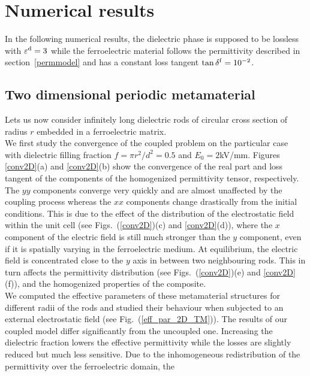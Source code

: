 \documentclass[%
 reprint,
 amsmath,amssymb,
 aps,
]{revtex4-2}
\newcommand{\epsd}{\varepsilon^{\rm d}}
\newcommand{\fig}[1]{Fig.~(\ref{#1})}
\begin{document}
\section*{Numerical results}
In the following numerical results, the dielectric phase is supposed to be
lossless with $\epsd = 3$ while the ferroelectric material follows the
permittivity described in section~\ref{permmodel} and has a constant loss
tangent $\tan \delta^{\rm f} = 10^{-2}$.



\subsection*{Two dimensional periodic metamaterial}
Lets us now consider infinitely long dielectric rods of circular cross section
of radius $r$ embedded in a ferroelectric matrix.\\
We first study the convergence of the coupled problem on the particular case with dielectric
filling fraction $f=\pi r^2/d^2=0.5$ and $E_0=2$kV/mm. Figures \ref{conv2D}(a) and \ref{conv2D}(b) show the
convergence of the real part and loss tangent of the components of the homogenized
 permittivity tensor, respectively. The $yy$ components converge very quickly
 and are almost unaffected by the coupling process whereas the
 $xx$ components change drastically from the initial conditions.
 This is due to the effect of the distribution
 of the electrostatic field within the unit cell (see Figs.~(\ref{conv2D})(c) and \ref{conv2D}(d)),
 where the $x$ component of the electric field is still much stronger
 than the $y$ component, even if it is spatially varying in the ferroelectric medium.
 At equilibrium, the electric field is concentrated close to the $y$ axis in between two neighbouring
 rods. This in turn affects the permittivity distribution (see Figs.~(\ref{conv2D})(e) and \ref{conv2D}(f)),
 and the homogenized properties of the composite.\\
 We computed the effective parameters of these metamaterial structures for different
 radii of the rods and studied their behaviour when subjected to an external
 electrostatic field (see \fig{eff_par_2D_TM}). The results of our coupled
 model differ significantly from the uncoupled one. Increasing the dielectric fraction
 lowers the effective permittivity while the losses are slightly reduced but much less sensitive.
 Due to the inhomogeneous redistribution of the permittivity over the ferroelectric domain, the
\end{document}
